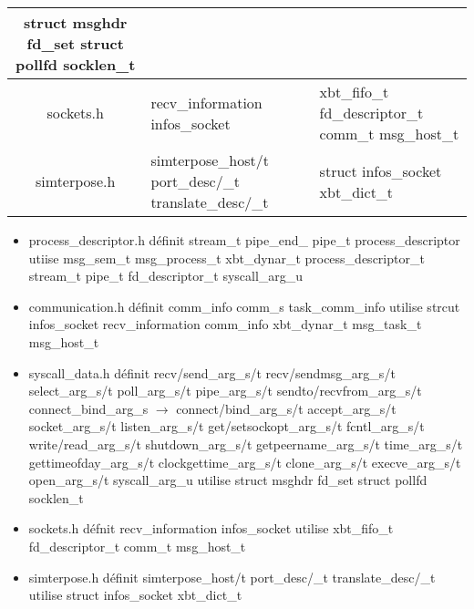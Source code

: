 \documentclass{article}
\begin{document}
\begin{tabularx}{15cm}{|c|X|X|}
  {\color{brown} struct msghdr \newline fd\_set \newline struct pollfd \newline socklen\_t}\\
  \hline
  sockets.h & {\color{purple} recv\_information \newline infos\_socket} &
  {\color{brown} xbt\_fifo\_t \newline fd\_descriptor\_t \newline comm\_t msg\_host\_t } \\
  \hline
 simterpose.h & {\color{purple} simterpose\_host/t \newline port\_desc/\_t \newline translate\_desc/\_t} & {\color{brown} struct infos\_socket \newline xbt\_dict\_t} \\
\hline
\end{tabularx}

\begin{itemize}
\item process\_descriptor.h définit {\color{purple} stream\_t pipe\_end\_\*
  pipe\_t process\_descriptor} utiise {\color{brown} msg\_sem\_t msg\_process\_t
  xbt\_dynar\_t process\_descriptor\_t stream\_t pipe\_t fd\_descriptor\_t
  syscall\_arg\_u}

\item communication.h définit {\color{purple} comm\_info comm\_s
  task\_comm\_info} utilise {\color{brown} strcut infos\_socket
  recv\_information comm\_info xbt\_dynar\_t msg\_task\_t msg\_host\_t}

\item syscall\_data.h définit {\color{purple} recv/send\_arg\_s/t
  recv/sendmsg\_arg\_s/t select\_arg\_s/t poll\_arg\_s/t pipe\_arg\_s/t
  sendto/recvfrom\_arg\_s/t connect\_bind\_arg\_s $\rightarrow$
  connect/bind\_arg\_s/t accept\_arg\_s/t socket\_arg\_s/t listen\_arg\_s/t
  get/setsockopt\_arg\_s/t fcntl\_arg\_s/t write/read\_arg\_s/t
  shutdown\_arg\_s/t getpeername\_arg\_s/t time\_arg\_s/t gettimeofday\_arg\_s/t
  clockgettime\_arg\_s/t clone\_arg\_s/t execve\_arg\_s/t open\_arg\_s/t
  syscall\_arg\_u} utilise {\color{brown} struct msghdr fd\_set struct pollfd
  socklen\_t}

\item sockets.h défnit {\color{purple} recv\_information infos\_socket} utilise
  {\color{brown} xbt\_fifo\_t fd\_descriptor\_t comm\_t msg\_host\_t }

\item simterpose.h définit {\color{purple} simterpose\_host/t port\_desc/\_t
  translate\_desc/\_t} utilise {\color{brown} struct infos\_socket xbt\_dict\_t}
\end{itemize}
\end{document}
